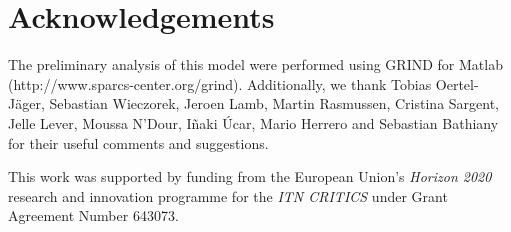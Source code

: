 \section{Acknowledgements}
\label{sec:Acknowledgements}
The preliminary analysis of this model were performed using GRIND for Matlab (http://www.sparcs-center.org/grind). Additionally, we thank Tobias Oertel-Jäger, Sebastian Wieczorek, Jeroen Lamb, Martin Rasmussen, Cristina Sargent, Jelle Lever, Moussa N'Dour, Iñaki Úcar, Mario Herrero and Sebastian Bathiany for their useful comments and suggestions. 

This work was supported by funding from the European Union's \textit{Horizon 2020} research and innovation programme for the \textit{ITN CRITICS} under Grant Agreement Number 643073.